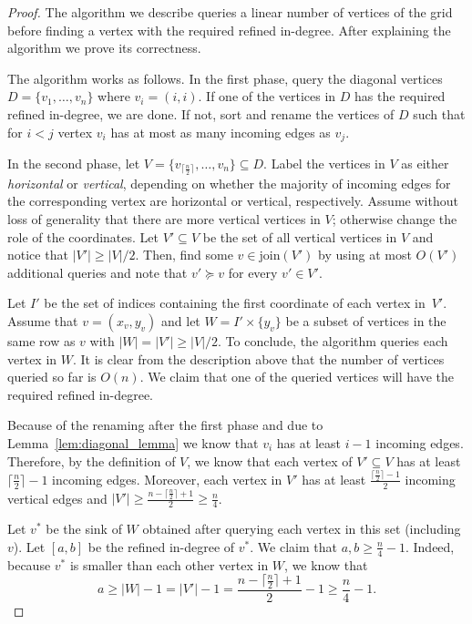 \documentclass[runningheads,a4paper]{llncs}
\newcommand{\indegree}{refined in-degree\xspace}
\newcommand{\join}{\mbox{join}\xspace}
\begin{document}
\begin{proof}
The algorithm we describe queries a linear number of vertices of the grid before finding a vertex with the required \indegree. 
After explaining the algorithm we prove its correctness.

The algorithm works as follows. In the first phase, query the diagonal vertices $D = \{v_1,\ldots, v_n\}$ where $v_i = (i,i)$.
If one of the vertices in $D$ has the required \indegree, we are done. 
If not, sort and rename the vertices of $D$ such that for $i < j$ vertex $v_i$ has at most as many incoming edges as $v_j$. 

In the second phase, let $V = \{v_{\lceil \frac{n}{2} \rceil},\ldots,v_n\} \subseteq D$.
Label the vertices in $V$ as either \emph{horizontal}  or \emph{vertical}, depending on whether the majority of incoming edges for the corresponding vertex are horizontal  or vertical, respectively. 
Assume without loss of generality that there are more vertical vertices in $V$; otherwise change the role of the coordinates. 
Let $V' \subseteq V$ be the set of all vertical vertices in $V$ and notice that $|V'| \geq |V|/2$.
Then, find some $v \in \join(V')$ by using at most $O(V')$ additional queries and note that $v' \succeq v$ for every $v' \in V'$.

Let $I'$ be the set of indices containing the first coordinate of each vertex in~$V'$. 
Assume that $v = (x_v, y_v)$ and let $W = I'\times \{y_v\}$ be a subset of vertices in the same row as $v$ with $|W| = |V'|\geq |V|/2$.
To conclude, the algorithm queries each vertex in $W$.
It is clear from the description above that the number of vertices queried so far is $O(n)$. 
We claim that one of the queried vertices will have the required \indegree.

Because of the renaming after the first phase and due to Lemma~\ref{lem:diagonal_lemma} we know that $v_i$ has at least $i-1$ incoming edges. 
Therefore, by the definition of $V$, we know that each vertex of $V'\subseteq V$ has at least $\lceil \frac{n}{2} \rceil - 1$ incoming edges.
Moreover, each vertex in $V'$ has at least $\frac{\lceil \frac{n}{2}\rceil-1}{2}$ incoming vertical edges and $|V'| \geq \frac{n-\lceil \frac{n}{2}\rceil + 1}{2} \geq \frac{n}{4}$. 

Let $v^*$ be the sink of $W$ obtained after querying each vertex in this set (including $v$). Let $[a,b]$ be the \indegree of $v^*$. We claim that $a, b \geq \frac{n}{4} - 1$. 
Indeed, because $v^*$ is smaller than each other vertex in $W$, we know that $$a \geq |W|-1 = |V'|-1 = \frac{n-\lceil \frac{n}{2}\rceil + 1}{2} - 1 \geq \frac{n}{4} - 1.$$



\end{proof}
\end{document}
